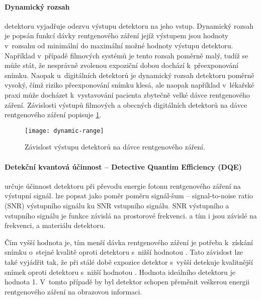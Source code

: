 \paragraph{Dynamický rozsah}
detektoru vyjadřuje odezvu výstupu detektoru na jeho vstup. Dynamický rozsah je popsán funkcí dávky rentgenového záření jejíž výstupem jsou hodnoty v~rozsahu od minimální do maximální možné hodnoty výstupu detektoru. Například v~případě filmových systémů je tento rozsah poměrně malý, tudíž se může stát, že nesprávně zvolenou expoziční dobou dochází k~přeexponování snímku. Naopak u~digitálních detektorů je dynamický rozsah detektoru poměrně vysoký, čímž riziko přeexponování snímku klesá, ale naopak například v~lékařské praxi může docházet k~vystavování pacienta zbytečně velké dávce rentgenového záření. Závislosti výstupů filmových a obecných digitálních detektorů na dávce rentgenového záření popisuje \cref{fig:dynamic-range}. \cite[str.~682]{Advances-in-Digital-Radiography}

\begin{figure}[ht]
\centering
\texttt{[image: dynamic-range]}
\caption{Závislost výstupu detektorů na dávce rentgenového záření. \cite[str.~682]{Advances-in-Digital-Radiography}}
\label{fig:dynamic-range}
\end{figure}

\paragraph{Detekční kvantová účinnost -- Detective Quantim Efficiency (DQE)}
určuje účinnost detektoru při převodu energie fotonu rentgenového záření na výstupní signál.  lze popsat jako poměr poměru signál-šum -- signal-to-noise ratio (SNR) výstupního signálu ku SNR vstupního signálu. SNR výstupního a vstupního signálu je funkce závislá na prostorové frekvenci.  a tím i  jsou závislé na frekvenci,  a materiálu detektoru. 

Čím vyšší hodnota  je, tím menší dávka rentgenového záření je potřeba k~získání snímku o~stejné kvalitě oproti detektoru s~nižší hodnotou . Tato závislost lze také vyjádřit tak, že při stálé době expozice detektor s~vyšší  detekuje kvalitnější snímek oproti detektoru s~nižší hodnotou . Hodnota  ideálního detektoru je hodnota 1. V~tomto případě by byl detektor schopen přeměnit veškerou energii rentgenového záření na obrazovou informaci.

